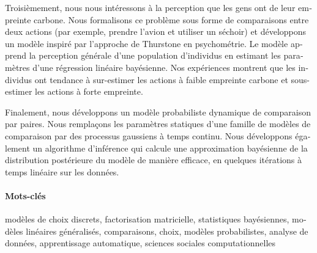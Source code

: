 \begin{otherlanguage}{french}
	Troisièmement, nous nous intéressons à la perception que les gens ont de leur empreinte carbone.
	Nous formalisons ce problème sous forme de comparaisons entre deux actions (par exemple, prendre l'avion et utiliser un séchoir) et développons un modèle inspiré par l'approche de Thurstone en psychométrie.
	Le modèle apprend la perception générale d'une population d'individus en estimant les paramètres d'une régression linéaire bayésienne.
	Nos expériences montrent que les individus ont tendance à sur-estimer les actions à faible empreinte carbone et sous-estimer les actions à forte empreinte.

	Finalement, nous développons un modèle probabiliste dynamique de comparaison par paires.
	Nous remplaçons les paramètres statiques d'une famille de modèles de comparaison par des processus gaussiens à temps continu.
	Nous développons également un algorithme d'inférence qui calcule une approximation bayésienne de la distribution postérieure du modèle de manière efficace, en quelques itérations à temps linéaire sur les données.

	\paragraph{Mots-clés}
	modèles de choix discrets, factorisation matricielle, statistiques bayésiennes, modèles linéaires généralisés, comparaisons, choix, modèles probabilistes, analyse de données, apprentissage automatique, sciences sociales computationnelles
\end{otherlanguage}
